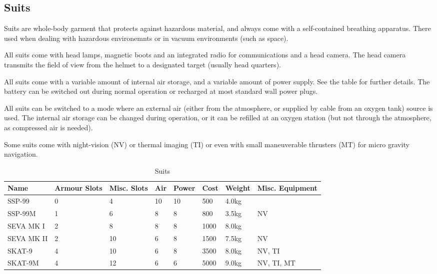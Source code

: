 \subsection{Suits}

Suits are whole-body garment that protects against hazardous material, and
always come with a self-contained breathing apparatus. There used when dealing
with hazardous environemnts or in vacuum environments (such as space).

All suits come with head lamps, magnetic boots and an integrated radio for
communications and a head camera. The head camera transmits the field of view
from the helmet to a designated target (usually head quarters).

All suits come with a variable amount of internal air storage, and a variable
amount of power supply. See the table for further details. The battery can be
switched out during normal operation or recharged at most standard wall power
plugs.

All suits can be switched to a mode where an external air (either from the
atmosphere, or supplied by cable from an oxygen tank) source is used.  The
internal air storage can be changed during operation, or it can be refilled at
an oxygen station (but not through the atmosphere, as compressed air is needed).

Some suits come with night-vision (NV) or thermal imaging (TI) or even with
small maneuverable thrusters (MT) for micro gravity navigation.

\begin{table}
  \caption{Suits}
  \label{tab:Suits}
  \begin{center}
    \begin{tabular}{| l | l | l | l | l | l | l | l |}

      \hline
      \textbf{Name} & \textbf{Armour Slots} & \textbf{Misc. Slots} &
      \textbf{Air} & \textbf{Power} & \textbf{Cost} & \textbf{Weight} &
      \textbf{Misc. Equipment} \\ \hline

      SSP-99     & 0 &  4 & 10 & 10 &  500 & 4.0kg & \\ \hline
      SSP-99M    & 1 &  6 &  8 &  8 &  800 & 3.5kg & NV \\ \hline

      SEVA MK I  & 2 &  8 &  8 &  8 & 1000 & 8.0kg & \\ \hline
      SEVA MK II & 2 & 10 &  6 &  8 & 1500 & 7.5kg & NV \\ \hline

      SKAT-9     & 4 & 10 &  6 &  8 & 3500 & 8.0kg & NV, TI \\ \hline
      SKAT-9M    & 4 & 12 &  6 &  6 & 5000 & 9.0kg & NV, TI, MT \\ \hline

    \end{tabular}
  \end{center}
\end{table}


